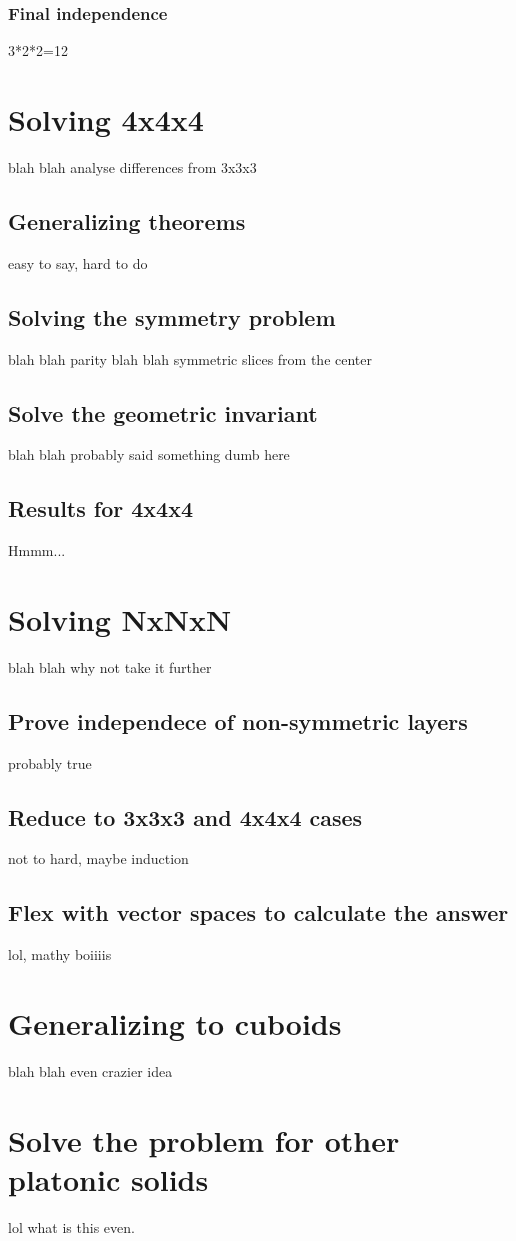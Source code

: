 \documentclass{article}
\begin{document}
            \subsubsection{Final independence}
                3*2*2=12
    
    \section{Solving 4x4x4}
        blah blah analyse differences from 3x3x3

        \subsection{Generalizing theorems}
            easy to say, hard to do

        \subsection{Solving the symmetry problem}
            blah blah parity blah blah symmetric slices from the center
        
        \subsection{Solve the geometric invariant}
            blah blah probably said something dumb here

        \subsection{Results for 4x4x4}
            Hmmm...

    \section{Solving NxNxN}
        blah blah why not take it further

        \subsection{Prove independece of non-symmetric layers}
            probably true

        \subsection{Reduce to 3x3x3 and 4x4x4 cases}
            not to hard, maybe induction

        \subsection{Flex with vector spaces to calculate the answer}
            lol, mathy boiiiis
    
    \section{Generalizing to cuboids}
        blah blah even crazier idea

    \section{Solve the problem for other platonic solids}
        lol what is this even.
\end{document}
